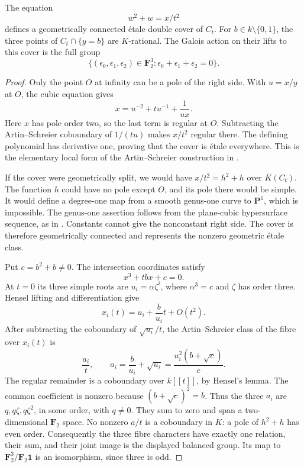 \begin{lemma}\label{lem:two-local-cover}
The equation
\begin{equation}\label{eq:two-local-AS}
w^2+w=x/t^2
\end{equation}
defines a geometrically connected \textup{\'etale} double cover of $C_t$. For $b\in k\setminus\{0,1\}$, the three points of $C_t\cap\{y=b\}$ are $K$-rational. The Galois action on their lifts to this cover is the full group
\[
\{(\epsilon_0,\epsilon_1,\epsilon_2)\in\mathbf F_2^3:
\epsilon_0+\epsilon_1+\epsilon_2=0\}.
\]
\end{lemma}
\begin{proof}
Only the point $O$ at infinity can be a pole of the right side. With $u=x/y$ at $O$, the cubic equation gives
\[
x=u^{-2}+tu^{-1}+\frac1{ux}.
\]
Here $x$ has pole order two, so the last term is regular at $O$. Subtracting the Artin--Schreier coboundary of $1/(tu)$ makes $x/t^2$ regular there. The defining polynomial has derivative one, proving that the cover is \textup{\'etale} everywhere. This is the elementary local form of the Artin--Schreier construction in \citet[Section~59.63]{StacksAS}.

If the cover were geometrically split, we would have $x/t^2=h^2+h$ over $\overline K(C_t)$. The function $h$ could have no pole except $O$, and its pole there would be simple. It would define a degree-one map from a smooth genus-one curve to $\mathbf P^1$, which is impossible. The genus-one assertion follows from the plane-cubic hypersurface sequence, as in \citet[Lemma~53.9.3]{StacksPlane}. Constants cannot give the nonconstant right side. The cover is therefore geometrically connected and represents the nonzero geometric \textup{\'etale} class.

Put $c=b^2+b\ne0$. The intersection coordinates satisfy
\[
x^3+tbx+c=0.
\]
At $t=0$ its three simple roots are $u_i=\alpha\zeta^i$, where $\alpha^3=c$ and $\zeta$ has order three. Hensel lifting and differentiation give
\[
x_i(t)=u_i+\frac b{u_i}t+O(t^2).
\]
After subtracting the coboundary of $\sqrt{u_i}/t$, the Artin--Schreier class of the fibre over $x_i(t)$ is
\[
\frac{a_i}{t},\qquad
 a_i=\frac b{u_i}+\sqrt{u_i}
     =\frac{u_i^2(b+\sqrt c)}c.
\]
The regular remainder is a coboundary over $k[[t]]$, by Hensel's lemma. The common coefficient is nonzero because $(b+\sqrt c)^2=b$. Thus the three $a_i$ are $q,q\zeta,q\zeta^2$, in some order, with $q\ne0$. They sum to zero and span a two-dimensional $\mathbf F_2$ space. No nonzero $a/t$ is a coboundary in $K$: a pole of $h^2+h$ has even order. Consequently the three fibre characters have exactly one relation, their sum, and their joint image is the displayed balanced group. Its map to $\mathbf F_2^3/\mathbf F_2\mathbf1$ is an isomorphism, since three is odd.
\end{proof}

